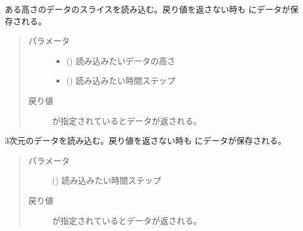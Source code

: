 \documentclass[letterpaper,10pt,dvipdfmx,report]{sphinxmanual}
\begin{document}

\begin{fulllineitems}
\label{\detokenize{io:R2D2.read_qq_select}}
ある高さのデータのスライスを読み込む。戻り値を返さない時も  にデータが保存される。
\begin{quote}\begin{description}
\item[{パラメータ}] \leavevmode\begin{itemize}
\item {} 
 () \sphinxhyphen{}\sphinxhyphen{} 読み込みたいデータの高さ

\item {} 
 () \sphinxhyphen{}\sphinxhyphen{} 読み込みたい時間ステップ

\end{itemize}

\item[{戻り値}] \leavevmode
{} が指定されているとデータが返される。

\end{description}\end{quote}

\end{fulllineitems}


\begin{fulllineitems}
\label{\detokenize{io:R2D2.read_qq}}
3次元のデータを読み込む。戻り値を返さない時も  にデータが保存される。
\begin{quote}\begin{description}
\item[{パラメータ}] \leavevmode
{} () \sphinxhyphen{}\sphinxhyphen{} 読み込みたい時間ステップ

\item[{戻り値}] \leavevmode
{} が指定されているとデータが返される。

\end{description}\end{quote}

\end{fulllineitems}
\end{document}

